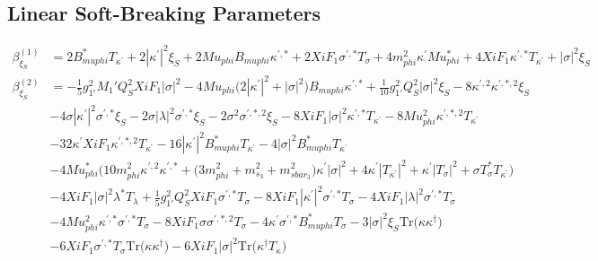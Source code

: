 \subsection{Linear Soft-Breaking Parameters}
{\allowdisplaybreaks  \begin{align} 
\beta_{\xi_S}^{(1)} & =  
2 B_{muphi}^* T_{\kappa^\prime}  + 2 |\kappa^\prime|^2 \xi_S  + 2 Mu_{phi} B_{muphi} \kappa^{\prime,*}  + 2 XiF_1 \sigma^{\prime,*} T_{\sigma}  + 4 m_{phi}^2 \kappa^\prime Mu_{phi}^*  + 4 XiF_1 \kappa^{\prime,*} T_{\kappa^\prime}  + |\sigma|^2 \xi_S \\ 
\beta_{\xi_S}^{(2)} & =  
-\frac{1}{5} g_{1'}^{2} M_1' Q_{S}^{2} XiF_1 |\sigma|^2 -4 Mu_{phi} \Big(2 |\kappa^\prime|^2  + |\sigma|^2\Big)B_{muphi} \kappa^{\prime,*} +\frac{1}{10} g_{1'}^{2} Q_{S}^{2} |\sigma|^2 \xi_S -8 \kappa^{\prime,2} \kappa^{\prime,*,2} \xi_S \nonumber \\ 
 &-4 \sigma |\kappa^\prime|^2 \sigma^{\prime,*} \xi_S -2 \sigma |\lambda|^2 \sigma^{\prime,*} \xi_S -2 \sigma^{2} \sigma^{\prime,*,2} \xi_S -8 XiF_1 |\sigma|^2 \kappa^{\prime,*} T_{\kappa^\prime} -8 Mu_{phi}^{2} \kappa^{\prime,*,2} T_{\kappa^\prime} \nonumber \\ 
 &-32 \kappa^\prime XiF_1 \kappa^{\prime,*,2} T_{\kappa^\prime} -16 |\kappa^\prime|^2 B_{muphi}^* T_{\kappa^\prime} -4 |\sigma|^2 B_{muphi}^* T_{\kappa^\prime} \nonumber \\ 
 &-4 Mu_{phi}^* \Big(10 m_{phi}^2 \kappa^{\prime,2} \kappa^{\prime,*}  + \Big(3 m_{phi}^2  + m_{s_3}^2 + m_{sbar_3}^2\Big)\kappa^\prime |\sigma|^2  + 4 \kappa^\prime |T_{\kappa^\prime}|^2  + \kappa^\prime |T_{\sigma}|^2  + \sigma T_{\sigma}^* T_{\kappa^\prime} \Big)\nonumber \\ 
 &-4 XiF_1 |\sigma|^2 \lambda^* T_{\lambda} +\frac{1}{5} g_{1'}^{2} Q_{S}^{2} XiF_1 \sigma^{\prime,*} T_{\sigma} -8 XiF_1 |\kappa^\prime|^2 \sigma^{\prime,*} T_{\sigma} -4 XiF_1 |\lambda|^2 \sigma^{\prime,*} T_{\sigma} \nonumber \\ 
 &-4 Mu_{phi}^{2} \kappa^{\prime,*} \sigma^{\prime,*} T_{\sigma} -8 XiF_1 \sigma \sigma^{\prime,*,2} T_{\sigma} -4 \kappa^\prime \sigma^{\prime,*} B_{muphi}^* T_{\sigma} -3 |\sigma|^2 \xi_S \mbox{Tr}\Big({\kappa  \kappa^{\dagger}}\Big) \nonumber \\ 
 &-6 XiF_1 \sigma^{\prime,*} T_{\sigma} \mbox{Tr}\Big({\kappa  \kappa^{\dagger}}\Big) -6 XiF_1 |\sigma|^2 \mbox{Tr}\Big({\kappa^{\dagger}  T_{\kappa}}\Big) 
\end{align}} 
